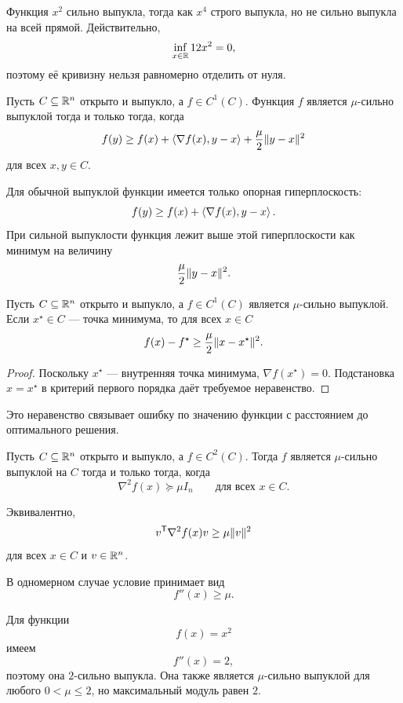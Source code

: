 Функция \(x^2\) сильно выпукла, тогда как \(x^4\) строго выпукла,
но не сильно выпукла на всей прямой. Действительно,
\[
    \inf_{x\in\mathbb{R}}12x^2=0,
\]
поэтому её кривизну нельзя равномерно отделить от нуля.



\begin{theorem}
Пусть \(C\subseteq\mathbb{R}^n\) открыто и выпукло, а
\(f\in C^1(C)\). Функция \(f\) является \(\mu\)-сильно выпуклой
тогда и только тогда, когда
\[
    f(y)
    \ge
    f(x)
    +
    \left\langle \nabla f(x),y-x \right\rangle
    +
    \frac{\mu}{2}\lVert y-x\rVert^2
\]
для всех \(x,y\in C\).
\end{theorem}

Для обычной выпуклой функции имеется только опорная гиперплоскость:
\[
    f(y)
    \ge
    f(x)+\left\langle \nabla f(x),y-x \right\rangle.
\]
При сильной выпуклости функция лежит выше этой гиперплоскости как
минимум на величину
\[
    \frac{\mu}{2}\lVert y-x\rVert^2.
\]

\begin{corollary}
Пусть \(C\subseteq\mathbb{R}^n\) открыто и выпукло, а
\(f\in C^1(C)\) является \(\mu\)-сильно выпуклой. Если
\(x^\star\in C\) --- точка минимума, то для всех \(x\in C\)
\[
    f(x)-f^\star
    \ge
    \frac{\mu}{2}\lVert x-x^\star\rVert^2.
\]
\end{corollary}

\begin{proof}
Поскольку \(x^\star\) --- внутренняя точка минимума,
\(\nabla f(x^\star)=0\). Подстановка \(x=x^\star\) в критерий
первого порядка даёт требуемое неравенство.
\end{proof}

Это неравенство связывает ошибку по значению функции с расстоянием
до оптимального решения.



\begin{theorem}
Пусть \(C\subseteq\mathbb{R}^n\) открыто и выпукло, а
\(f\in C^2(C)\). Тогда \(f\) является \(\mu\)-сильно выпуклой на
\(C\) тогда и только тогда, когда
\[
    \nabla^2f(x)\succeq\mu I_n
    \qquad
    \text{для всех }x\in C.
\]
\end{theorem}

Эквивалентно,
\[
    v^{\mathsf T}\nabla^2f(x)v
    \ge
    \mu\lVert v\rVert^2
\]
для всех \(x\in C\) и \(v\in\mathbb{R}^n\).

В одномерном случае условие принимает вид
\[
    f''(x)\ge\mu.
\]

Для функции
\[
    f(x)=x^2
\]
имеем
\[
    f''(x)=2,
\]
поэтому она \(2\)-сильно выпукла. Она также является
\(\mu\)-сильно выпуклой для любого \(0<\mu\le2\), но максимальный
модуль равен \(2\).

